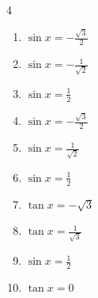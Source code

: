 \begin{multicols}{4}
\begin{enumerate}

  \item $\displaystyle \sin{x}  = -\frac{\sqrt{3}}{2}$


  \item $\displaystyle \sin{x}  = -\frac{1}{\sqrt{2}}$


  \item $\displaystyle \sin{x}  = \frac{1}{2}$


  \item $\displaystyle \sin{x}  = -\frac{\sqrt{3}}{2}$


  \item $\displaystyle \sin{x}  = \frac{1}{\sqrt{2}}$


\columnbreak %

\resetques

  \item $\displaystyle \sin{x}  = \frac{1}{2}$


  \item $\displaystyle \tan{x}  = -\sqrt{3}$


  \item $\displaystyle \tan{x}  = \frac{1}{\sqrt{3}}$


  \item $\displaystyle \sin{x}  = \frac{1}{2}$


  \item $\displaystyle \tan{x}  = 0$

        \phantom{$\displaystyle x = 0 , \pi$}


\end{enumerate}
\end{multicols}
